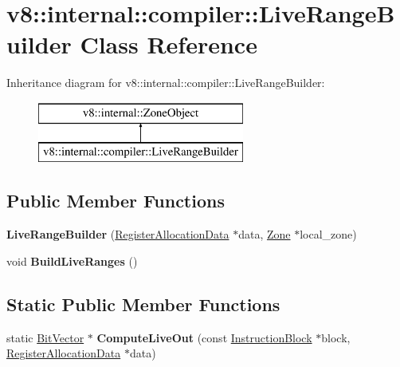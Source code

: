\hypertarget{classv8_1_1internal_1_1compiler_1_1_live_range_builder}{}\section{v8\+:\+:internal\+:\+:compiler\+:\+:Live\+Range\+Builder Class Reference}
\label{classv8_1_1internal_1_1compiler_1_1_live_range_builder}
Inheritance diagram for v8\+:\+:internal\+:\+:compiler\+:\+:Live\+Range\+Builder\+:\begin{figure}[H]
\begin{center}
\leavevmode
\includegraphics[height=2.000000cm]{classv8_1_1internal_1_1compiler_1_1_live_range_builder}
\end{center}
\end{figure}
\subsection*{Public Member Functions}
\begin{DoxyCompactItemize}
\item 
{\bfseries Live\+Range\+Builder} (\hyperlink{classv8_1_1internal_1_1compiler_1_1_register_allocation_data}{Register\+Allocation\+Data} $\ast$data, \hyperlink{classv8_1_1internal_1_1_zone}{Zone} $\ast$local\+\_\+zone)\hypertarget{classv8_1_1internal_1_1compiler_1_1_live_range_builder_afba1597ff4fa8b4e34b98973281f30d9}{}\label{classv8_1_1internal_1_1compiler_1_1_live_range_builder_afba1597ff4fa8b4e34b98973281f30d9}

\item 
void {\bfseries Build\+Live\+Ranges} ()\hypertarget{classv8_1_1internal_1_1compiler_1_1_live_range_builder_a05f8a8d1f9c83f343b315774a152eb29}{}\label{classv8_1_1internal_1_1compiler_1_1_live_range_builder_a05f8a8d1f9c83f343b315774a152eb29}

\end{DoxyCompactItemize}
\subsection*{Static Public Member Functions}
\begin{DoxyCompactItemize}
\item 
static \hyperlink{classv8_1_1internal_1_1_bit_vector}{Bit\+Vector} $\ast$ {\bfseries Compute\+Live\+Out} (const \hyperlink{classv8_1_1internal_1_1compiler_1_1_instruction_block}{Instruction\+Block} $\ast$block, \hyperlink{classv8_1_1internal_1_1compiler_1_1_register_allocation_data}{Register\+Allocation\+Data} $\ast$data)\hypertarget{classv8_1_1internal_1_1compiler_1_1_live_range_builder_a760b7baedce539c7d2d014feceee8ee6}{}\label{classv8_1_1internal_1_1compiler_1_1_live_range_builder_a760b7baedce539c7d2d014feceee8ee6}

\end{DoxyCompactItemize}
